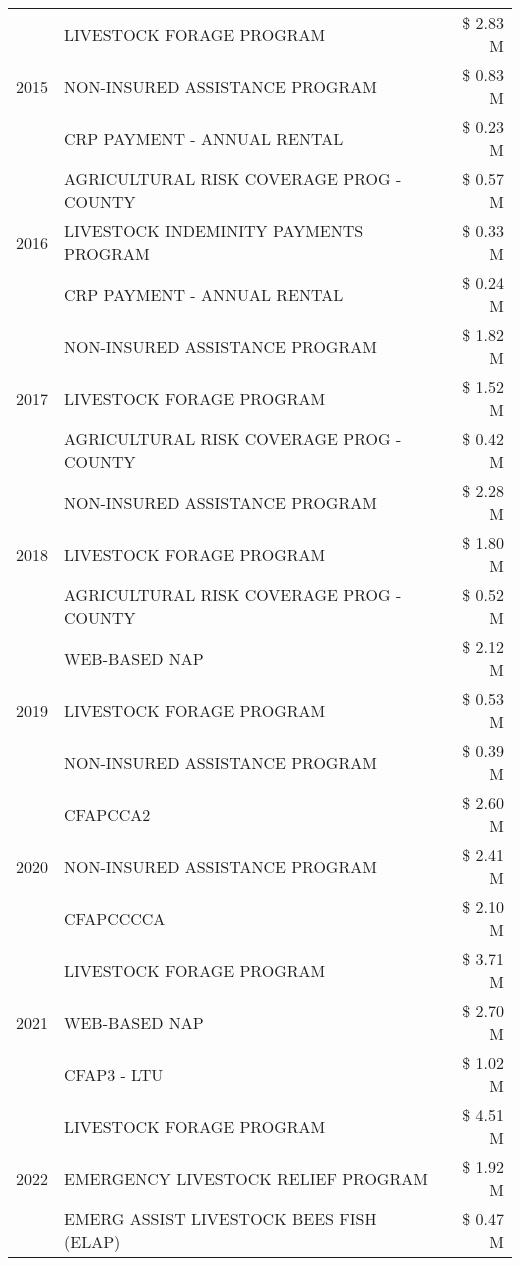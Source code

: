 \begin{tabular}{llr}
\cline{1-3}
\multirow[t]{3}{*}{2015} & LIVESTOCK FORAGE PROGRAM & \$ 2.83 M \\
 & NON-INSURED ASSISTANCE PROGRAM & \$ 0.83 M \\
 & CRP PAYMENT - ANNUAL RENTAL & \$ 0.23 M \\
\cline{1-3}
\multirow[t]{3}{*}{2016} & AGRICULTURAL RISK COVERAGE PROG - COUNTY & \$ 0.57 M \\
 & LIVESTOCK INDEMINITY PAYMENTS PROGRAM & \$ 0.33 M \\
 & CRP PAYMENT - ANNUAL RENTAL & \$ 0.24 M \\
\cline{1-3}
\multirow[t]{3}{*}{2017} & NON-INSURED ASSISTANCE PROGRAM & \$ 1.82 M \\
 & LIVESTOCK FORAGE PROGRAM & \$ 1.52 M \\
 & AGRICULTURAL RISK COVERAGE PROG - COUNTY & \$ 0.42 M \\
\cline{1-3}
\multirow[t]{3}{*}{2018} & NON-INSURED ASSISTANCE PROGRAM & \$ 2.28 M \\
 & LIVESTOCK FORAGE PROGRAM & \$ 1.80 M \\
 & AGRICULTURAL RISK COVERAGE PROG - COUNTY & \$ 0.52 M \\
\cline{1-3}
\multirow[t]{3}{*}{2019} & WEB-BASED NAP & \$ 2.12 M \\
 & LIVESTOCK FORAGE PROGRAM & \$ 0.53 M \\
 & NON-INSURED ASSISTANCE PROGRAM & \$ 0.39 M \\
\cline{1-3}
\multirow[t]{3}{*}{2020} & CFAPCCA2 & \$ 2.60 M \\
 & NON-INSURED ASSISTANCE PROGRAM & \$ 2.41 M \\
 & CFAPCCCCA & \$ 2.10 M \\
\cline{1-3}
\multirow[t]{3}{*}{2021} & LIVESTOCK FORAGE PROGRAM & \$ 3.71 M \\
 & WEB-BASED NAP & \$ 2.70 M \\
 & CFAP3 - LTU & \$ 1.02 M \\
\cline{1-3}
\multirow[t]{3}{*}{2022} & LIVESTOCK FORAGE PROGRAM & \$ 4.51 M \\
 & EMERGENCY LIVESTOCK RELIEF PROGRAM & \$ 1.92 M \\
 & EMERG ASSIST LIVESTOCK BEES FISH (ELAP) & \$ 0.47 M \\
\cline{1-3}
\bottomrule
\end{tabular}
